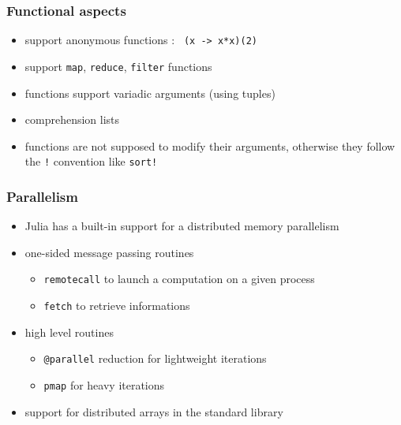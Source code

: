\documentclass[11pt,mathserif]{beamer}
\newcommand{\julia}{{ Julia}{} }
\begin{document}

\begin{frame}[fragile]
  \frametitle{Functional aspects}
  \begin{itemize}[<+->]
    \item support anonymous functions : \texttt{ (x -> x*x)(2) }
    \item support \texttt{map}, \texttt{reduce}, \texttt{filter} functions
    \item functions support variadic arguments (using tuples)
    \item comprehension lists
    \item functions are not supposed to modify their arguments, otherwise
    they follow the \texttt{!} convention like \texttt{sort!}
  \end{itemize}
\end{frame}

\begin{frame}[fragile]
  \frametitle{Parallelism}
  \pause
  \begin{itemize}[<+->]
    \item \julia has a built-in support for a distributed memory parallelism
    \item one-sided message passing routines 
    \begin{itemize}
      \item \texttt{remotecall} to launch a computation on a given process 
      \item \texttt{fetch} to retrieve informations 
    \end{itemize}     

    \item  high level routines
    \begin{itemize}
      \item \texttt{@parallel} reduction for lightweight iterations
      \item \texttt{pmap} for heavy iterations
    \end{itemize}     
    \item support for distributed arrays in the standard library 
  \end{itemize}
\end{frame}
\end{document}
